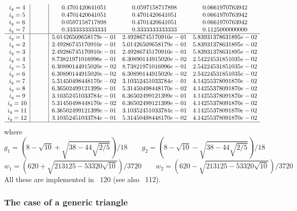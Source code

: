 {\[\begin{array}{c|ccc|ccc}
i_q=4 &&&&0.4701420641051 &  0.0597158717898  &     0.0661970763942 \\
i_q=5 &&&&0.4701420641051 &  0.4701420641051  &     0.0661970763942 \\
i_q=6 &&&&0.0597158717898 &  0.4701420641051  &     0.0661970763942 \\
i_q=7 &&&&0.3333333333333 &  0.3333333333333  &     0.1125000000000 \\
\hline
i_q=1&&&& 5.01426509658179e-01&  2.49286745170910e-01 &   5.83931378631895e-02 \\ 
i_q=2&&&& 2.49286745170910e-01&  5.01426509658179e-01 &   5.83931378631895e-02 \\ 
i_q=3&&&& 2.49286745170910e-01&  2.49286745170910e-01 &   5.83931378631895e-02 \\ 
i_q=4&&&& 8.73821971016996e-01&  6.30890144915020e-02 &   2.54224531851035e-02 \\ 
i_q=5&&&& 6.30890144915020e-02&  8.73821971016996e-01 &   2.54224531851035e-02 \\ 
i_q=6&&&& 6.30890144915020e-02&  6.30890144915020e-02 &   2.54224531851035e-02 \\ 
i_q=7&&&& 5.31450498448170e-02&  3.10352451033784e-01 &   4.14255378091870e-02 \\ 
i_q=8&&&& 6.36502499121399e-01&  5.31450498448170e-02 &   4.14255378091870e-02 \\ 
i_q=9&&&& 3.10352451033784e-01&  6.36502499121399e-01 &   4.14255378091870e-02 \\ 
i_q=10&&&& 5.31450498448170e-02&  6.36502499121399e-01 &   4.14255378091870e-02 \\ 
i_q=11&&&& 6.36502499121399e-01&  3.10352451033784e-01 &   4.14255378091870e-02 \\ 
i_q=12&&&& 3.10352451033784e-01&  5.31450498448170e-02 &   4.14255378091870e-02 \\ 
\hline
\end{array}
\]
}
where
\[ 
g_1 = \left(8-\sqrt{10} + \sqrt{38-44\sqrt{2/5}}\right)/18
\qquad
g_2 = \left(8-\sqrt{10} - \sqrt{38-44\sqrt{2/5}}\right)/18
\]
\[
w_1 = \left(620+\sqrt{213125-53320\sqrt{10}}\right)/3720
\qquad
w_2 = \left(620-\sqrt{213125-53320\sqrt{10}}\right)/3720
\]
All these are implemented in \stone~120 (see also \stone~112).


\subsubsection*{The case of a generic triangle}

